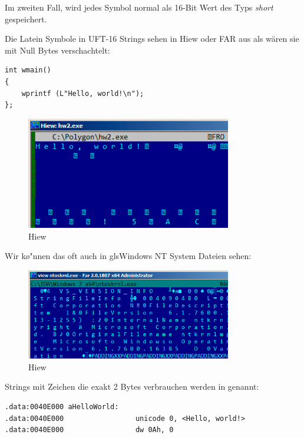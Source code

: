 Im zweiten Fall, wird jedes Symbol normal als 16-Bit Wert des Typs \emph{short} gespeichert.

Die Latein Symbole in UFT-16 Strings sehen in Hiew oder FAR aus als w\"aren sie mit Null Bytes verschachtelt:

\begin{lstlisting}[style=customc]
int wmain()
{
	wprintf (L"Hello, world!\n");
};
\end{lstlisting}

\begin{figure}[H]
\centering
\includegraphics[width=0.8\textwidth]{digging_into_code/strings/UTF16-string.png}
\caption{Hiew}
\end{figure}

Wir k\o"nnen das oft auch in gls{Windows NT} System Dateien sehen:

\begin{figure}[H]
\centering
\includegraphics[width=0.8\textwidth]{digging_into_code/strings/ntoskrnl_UTF16.png}
\caption{Hiew}
\end{figure}

Strings mit Zeichen die exakt 2 Bytes verbrauchen werden  in \IDA genannt:

\begin{lstlisting}[style=customasmx86]
.data:0040E000 aHelloWorld:
.data:0040E000                 unicode 0, <Hello, world!>
.data:0040E000                 dw 0Ah, 0
\end{lstlisting}

